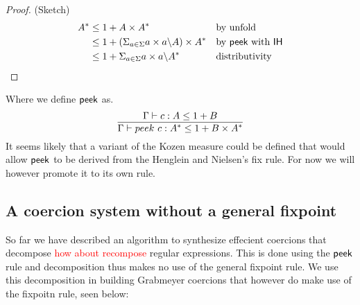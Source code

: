 \documentclass[a4paper,UKenglish,cleveref, autoref, thm-restate]{lipics-v2021}
\newcommand\mycomment[1]{\textcolor{red}{#1}}
\begin{document}
\begin{proof} (Sketch)
\begin{align}
A^* &\leq  1 + A \times A^* && \text{by unfold}\\
 &\leq 1 + (\Sigma_{a \in \Sigma} a\times a \backslash A) \times A^* && \text{by } \textsf{peek}~\text{with }\textsf{IH}\\
 &\leq 1 + \Sigma_{a \in \Sigma} a\times a \backslash A^* && \text{distributivity} 
\end{align}
\end{proof}
Where we define $\textsf{peek}$ as.
\[ \infer{\containsG{peek ~ c}{A^*}{1 + B \times A^*}}{\containsG{c}{A}{1 + B}} \]
It seems likely that a variant of the Kozen measure could be defined that would allow $\textsf{peek}$ to be derived from the Henglein and Nielsen's fix rule. For now we will however promote it to its own rule. 
\subsection{A coercion system without a general fixpoint}
So far we have described an algorithm to synthesize effecient coercions that decompose \mycomment{how about recompose} regular expressions. This is done using the $\textsf{peek}$ rule and decomposition thus makes no use of the general fixpoint rule. We use this decomposition in building Grabmeyer coercions that however do make use of the fixpoitn rule, seen below:

\end{document}
